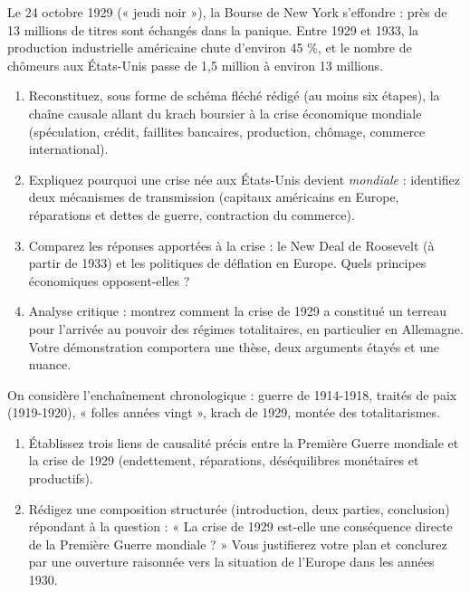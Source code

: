 \documentclass[11pt]{article}
\begin{document}
\begin{exercice}
Le 24 octobre 1929 (« jeudi noir »), la Bourse de New York s'effondre : près de 13 millions de titres sont échangés dans la panique. Entre 1929 et 1933, la production industrielle américaine chute d'environ 45 \%, et le nombre de chômeurs aux États-Unis passe de 1,5 million à environ 13 millions.
\begin{enumerate}
\item Reconstituez, sous forme de schéma fléché rédigé (au moins six étapes), la chaîne causale allant du krach boursier à la crise économique mondiale (spéculation, crédit, faillites bancaires, production, chômage, commerce international).
\item Expliquez pourquoi une crise née aux États-Unis devient \emph{mondiale} : identifiez deux mécanismes de transmission (capitaux américains en Europe, réparations et dettes de guerre, contraction du commerce).
\item Comparez les réponses apportées à la crise : le New Deal de Roosevelt (à partir de 1933) et les politiques de déflation en Europe. Quels principes économiques opposent-elles ?
\item Analyse critique : montrez comment la crise de 1929 a constitué un terreau pour l'arrivée au pouvoir des régimes totalitaires, en particulier en Allemagne. Votre démonstration comportera une thèse, deux arguments étayés et une nuance.
\end{enumerate}
\end{exercice}

\begin{exercice}
On considère l'enchaînement chronologique : guerre de 1914-1918, traités de paix (1919-1920), « folles années vingt », krach de 1929, montée des totalitarismes.
\begin{enumerate}
\item Établissez trois liens de causalité précis entre la Première Guerre mondiale et la crise de 1929 (endettement, réparations, déséquilibres monétaires et productifs).
\item Rédigez une composition structurée (introduction, deux parties, conclusion) répondant à la question : « La crise de 1929 est-elle une conséquence directe de la Première Guerre mondiale ? » Vous justifierez votre plan et conclurez par une ouverture raisonnée vers la situation de l'Europe dans les années 1930.
\end{enumerate}
\end{exercice}
\end{document}
